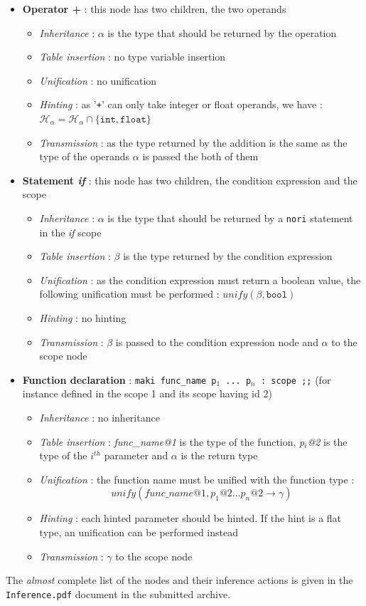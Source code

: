 \documentclass[a4paper,11pt]{article}
\begin{document}
\begin{itemize}
	\item \textbf{Operator +} : this node has two children, the two operands
	\begin{itemize}
		\item \textit{Inheritance} : $\alpha$ is the type that should be returned by the operation
		\item \textit{Table insertion} : no type variable insertion
		\item \textit{Unification} : no unification
		\item \textit{Hinting} : as '\texttt{+}' can only take integer or float operands, we have : $\mathcal{H}_\alpha = \mathcal{H}_\alpha \cap \{\texttt{int}, \texttt{float}\}$
		\item \textit{Transmission} : as the type returned by the addition is the same as the type of the operands $\alpha$ is passed the both of them
	\end{itemize}
	\item \textbf{Statement \textit{if}} : this node has two children, the condition expression and the scope
	\begin{itemize}
		\item \textit{Inheritance} : $\alpha$ is the type that should be returned by a \texttt{nori} statement in the \textit{if} scope
		\item \textit{Table insertion} : $\beta$ is the type returned by the condition expression
		\item \textit{Unification} : as the condition expression must return a boolean value, the following unification must be performed : $unify(\beta, \texttt{bool})$
		\item \textit{Hinting} : no hinting
		\item \textit{Transmission} : $\beta$ is passed to the condition expression node and $\alpha$ to the scope node
	\end{itemize}
	\item \textbf{Function declaration} : \texttt{maki func\_name p$_1$ ... p$_n$ : scope ;;} (for instance defined in the scope 1 and its scope having id 2)
	\begin{itemize}
		\item \textit{Inheritance} : no inheritance
		\item \textit{Table insertion} : \textit{func\_name@1} is the type of the function, \textit{p$_i$@2} is the type of the $i^{th}$ parameter and $\alpha$ is the return type
		\item \textit{Unification} : the function name must be unified with the function type :
		\[ unify(\textit{func\_name@1}, \textit{p}_1\textit{@2} \hdots \textit{p}_n\textit{@2} \rightarrow \gamma) \]
		\item \textit{Hinting} : each hinted parameter should be hinted. If the hint is a flat type, an unification can be performed instead
		\item \textit{Transmission} : $\gamma$ to the scope node
	\end{itemize}
\end{itemize}
The \textit{almost} complete list of the nodes and their inference actions is given in the \texttt{Inference.pdf} document in the submitted archive.
\end{document}
